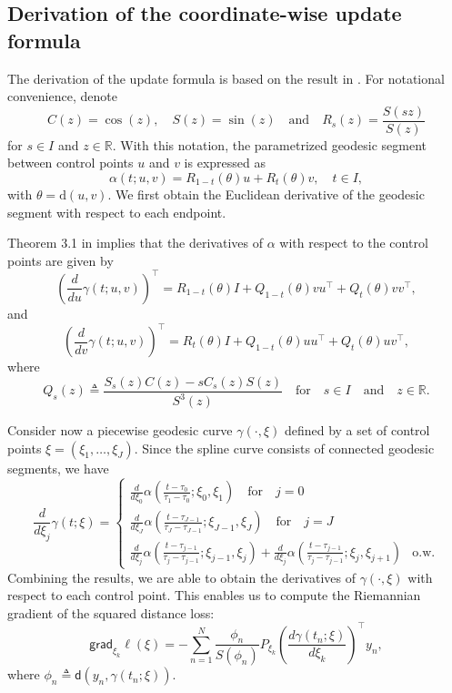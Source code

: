 \subsection*{Derivation of the coordinate-wise update formula}\label{derivation-of-the-coordinate-wise-update-formula}

The derivation of the update formula is based on the result in \citet{bak2023intrinsic}.
For notational convenience, denote
\[
C(z) = \cos(z), \quad S(z) = \sin(z) \quad \text{and} \quad R_s(z) = \frac{S(sz)}{S(z)}
\]
for \(s \in I\) and \(z \in \mathbb{R}\). With this notation, the parametrized geodesic segment between control points \(u\) and \(v\) is expressed as
\[
\alpha(t; u, v) = R_{1-t} (\theta) u + R_t(\theta) v,
\quad t \in I,
\]
with \(\theta = \text{d}(u, v)\).
We first obtain the Euclidean derivative of the geodesic segment with respect to each endpoint.

Theorem 3.1 in \citet{bak2023intrinsic} implies that the derivatives of \(\alpha\) with respect to the control points are given by
\[
\left(\frac{d}{du} \gamma(t; u, v) \right)^\top
=
R_{1-t}(\theta) I + Q_{1-t}(\theta) v u^\top + Q_t(\theta) v v^\top,
\]
and
\[
\left(\frac{d}{dv} \gamma(t; u, v) \right)^\top
=
R_{t}(\theta) I + Q_{1-t}(\theta) u u^\top + Q_t(\theta) u v^\top,
\]
where
\[
Q_s(z)
\triangleq
\frac{S_s(z) C(z) - s C_s(z) S(z)}{S^3 (z)}
\quad \text{for} \quad s \in I \quad \text{and} \quad z \in \mathbb{R}
.
\]

Consider now a piecewise geodesic curve \(\gamma(\cdot, \xi)\) defined by a set of control points \(\xi = (\xi_1, \ldots, \xi_J)\).
Since the spline curve consists of connected geodesic segments, we have
\[
\frac{d}{d \xi_j} \gamma(t;\xi) =
\begin{cases}
\frac{d}{d \xi_0} \alpha\left(\frac{t - \tau_0}{\tau_{1} - \tau_0};\xi_0, \xi_1\right) \quad \text{for} \quad j = 0 \\
\frac{d}{d \xi_J} \alpha\left(\frac{t - \tau_{J-1}}{\tau_{J} - \tau_{J-1}};\xi_{J-1}, \xi_J\right)  \quad \text{for} \quad j = J \\
\frac{d}{d \xi_j} \alpha\left(\frac{t - \tau_{j-1}}{\tau_{j} - \tau_{j-1}};\xi_{j-1}, \xi_j\right)
+
\frac{d}{d \xi_j} \alpha\left(\frac{t - \tau_{j-1}}{\tau_{j} - \tau_{j-1}};\xi_{j}, \xi_{j+1}\right) & \text{o.w.}
\end{cases}
\]
Combining the results, we are able to obtain the derivatives of \(\gamma(\cdot, \xi)\) with respect to each control point. This enables us to compute the Riemannian gradient of the squared distance loss:
\[
\textsf{grad}_{\xi_k} \ell(\xi)
=
- \sum_{n=1}^N \frac{\phi_n}{S(\phi_n)} P_{\xi_k} \left(\frac{d \gamma(t_n;\xi)}{d\xi_k}\right)^\top y_n,
\]
where \(\phi_n \triangleq \mathsf{d}(y_n, \gamma(t_n; \xi))\).

